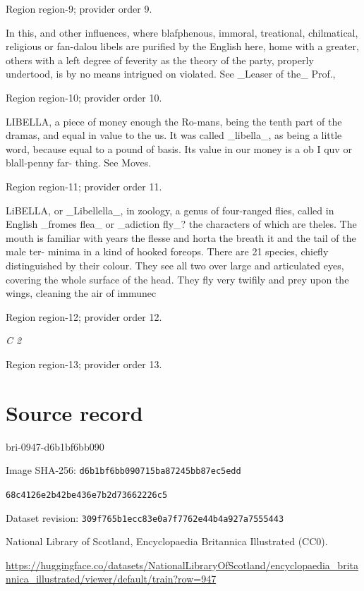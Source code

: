 \documentclass[11pt]{article}
\begin{document}
{\scriptsize\color{gray} Region region-9; provider order 9.\par}
\medskip

In this, and other influences, where blafphenous, immoral, treational, chilmatical, religious or fan-dalou libels are purified by the English here, home with a greater, others with a left degree of feverity as the theory of the party, properly undertood, is by no means intrigued on violated. See \_Leaser of the\_ Prof.,
\par

{\scriptsize\color{gray} Region region-10; provider order 10.\par}
\medskip

LIBELLA, a piece of money enough the Ro-mans, being the tenth part of the dramas, and equal in value to the us. It was called \_libella\_, as being a little word, because equal to a pound of basis. Its value in our money is a ob I quv or blall-penny far- thing. See Moves.
\par

{\scriptsize\color{gray} Region region-11; provider order 11.\par}
\medskip

LiBELLA, or \_Libellella\_, in zoology, a genus of four-ranged flies, called in English \_fromes flea\_ or \_adiction fly\_? the characters of which are theles. The mouth is familiar with years the flesse and horta the breath it and the tail of the male ter- minima in a kind of hooked foreops. There are 21 species, chiefly distinguished by their colour. They see all two over large and articulated eyes, covering the whole surface of the head. They fly very twifily and prey upon the wings, cleaning the air of immunec
\par

{\scriptsize\color{gray} Region region-12; provider order 12.\par}
\medskip

{\small\itshape C 2\par}

{\scriptsize\color{gray} Region region-13; provider order 13.\par}
\medskip
\newpage\section*{Source record}
bri-0947-d6b1bf6bb090\par
Image SHA-256: \texttt{d6b1bf6bb090715ba87245bb87ec5edd}\par\texttt{68c4126e2b42be436e7b2d73662226c5}\par
Dataset revision: \texttt{309f765b1ecc83e0a7f7}\texttt{762e44b4a927a7555443}\par
National Library of Scotland, Encyclopaedia Britannica Illustrated (CC0).\par
\url{https://huggingface.co/datasets/NationalLibraryOfScotland/encyclopaedia_britannica_illustrated/viewer/default/train?row=947}
\end{document}
